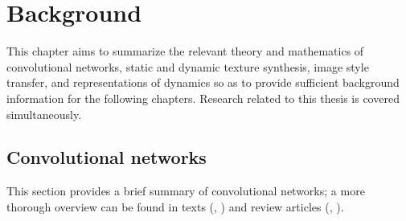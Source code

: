 \chapter{Background}\label{chap:background}

This chapter aims to summarize the relevant theory and mathematics of
convolutional networks,
static and dynamic texture synthesis, image style transfer, and representations of dynamics so as to provide sufficient
background information for the following chapters. Research
related to this thesis is covered simultaneously.

\section{Convolutional networks}

This section provides a brief summary of convolutional networks; a more thorough overview can be found in texts (\eg, \cite{goodfellow2016}) and review articles (\eg, \cite{hadji2018}).

